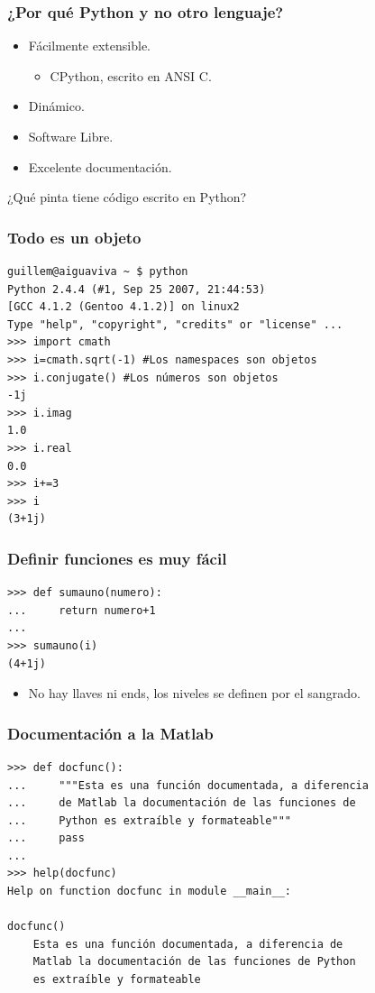 \documentclass{beamer}
\begin{document}
\begin{frame}
 \frametitle{¿Por qué Python y no otro lenguaje?}
\begin{itemize}
 \item Fácilmente extensible.
 \begin{itemize}
 \item CPython, escrito en ANSI C.
\end{itemize}
 \item Dinámico.
 \item Software Libre.
 \item Excelente documentación.
\end{itemize}

\end{frame}


\begin{frame}
\begin{center}
\begin{LARGE}
¿Qué pinta tiene código escrito en Python?
\end{LARGE} 
\end{center}
\end{frame}

\begin{frame}[containsverbatim]
 \frametitle{Todo es un objeto}
\begin{verbatim}
guillem@aiguaviva ~ $ python
Python 2.4.4 (#1, Sep 25 2007, 21:44:53)
[GCC 4.1.2 (Gentoo 4.1.2)] on linux2
Type "help", "copyright", "credits" or "license" ...
>>> import cmath
>>> i=cmath.sqrt(-1) #Los namespaces son objetos
>>> i.conjugate() #Los números son objetos
-1j
>>> i.imag
1.0
>>> i.real
0.0
>>> i+=3 
>>> i
(3+1j)
\end{verbatim}
\end{frame}

\begin{frame}[containsverbatim]
 \frametitle{Definir funciones es muy fácil}
\begin{verbatim}
>>> def sumauno(numero):
...     return numero+1
...
>>> sumauno(i)
(4+1j)
\end{verbatim}
\begin{itemize}
 \item No hay llaves ni ends, los niveles se definen por el sangrado.
\end{itemize}
\end{frame}

\begin{frame}[containsverbatim]
 \frametitle{Documentación a la Matlab}
\begin{verbatim}
>>> def docfunc():
...     """Esta es una función documentada, a diferencia
...     de Matlab la documentación de las funciones de
...     Python es extraíble y formateable"""
...     pass
...
>>> help(docfunc)
Help on function docfunc in module __main__:

docfunc()
    Esta es una función documentada, a diferencia de
    Matlab la documentación de las funciones de Python
    es extraíble y formateable
\end{verbatim}
\end{frame}
\end{document}
